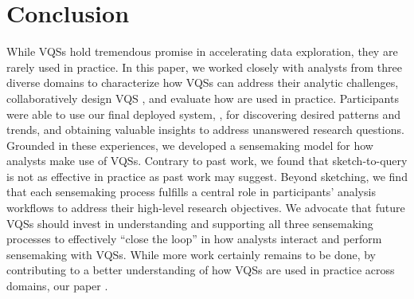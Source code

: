 \section{Conclusion\label{sec:conclusion}}
While VQSs hold tremendous promise in accelerating data exploration, they are rarely used in practice. In this paper, we worked closely with analysts from three diverse domains to characterize how VQSs can address their analytic challenges, collaboratively design VQS , and evaluate how  are used in practice. Participants were able to use our final deployed system, \zvpp, for discovering desired patterns and trends, and obtaining valuable insights to address unanswered research questions. Grounded in these experiences, we developed a sensemaking model for how analysts make use of VQSs. Contrary to past work, we found that sketch-to-query is not as effective in practice as past work may suggest. Beyond sketching, we find that each sensemaking process fulfills a central role in participants' analysis workflows to address their high-level research objectives. We advocate that future VQSs should invest in understanding and supporting all three sensemaking processes to effectively ``close the loop'' in how analysts interact and perform sensemaking with VQSs. While more work certainly remains to be done, by contributing to a better understanding of how VQSs are used in practice across domains, our paper .

